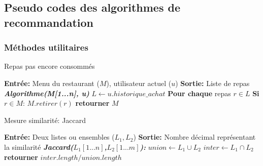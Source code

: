 \documentclass[11pt]{article}
\begin{document}
\subsection{Pseudo codes des algorithmes de recommandation}
\label{annexe}
\subsubsection{Méthodes utilitaires}
\begin{algorithm}
    \caption{Repas pas encore consommés}
    \begin{algorithmic}[1]
    \Statex \textbf{Entrée:} Menu du restaurant ($M$), utilisateur actuel ($u$)
    \Statex \textbf{Sortie:} Liste de repas
    \State \textbf{\textit{Algorithme(M[1...n], u)}}
    \State \hspace{0.5cm} $L \leftarrow u.historique\_achat$
    \State \hspace{0.5cm} \textbf{Pour chaque} repas $r \in L$
    \State \hspace{1cm} \textbf{Si} $r \in M$:
    \State \hspace{1.5cm} $M.retirer(r)$
    \State \hspace{0.5cm} \textbf{retourner} $M$
    \end{algorithmic}
\end{algorithm}

\begin{algorithm}
    \caption{Mesure similarité: Jaccard}
    \begin{algorithmic}[1]
    \Statex \textbf{Entrée:} Deux listes ou ensembles ($L_1, L_2$)
    \Statex \textbf{Sortie:} Nombre décimal représentant la similarité
    \State \textbf{\textit{Jaccard($L_1[1...n]$,$L_2[1...m]$):}}
    \State \hspace{0.5cm} $union \leftarrow L_1 \cup L_2$
    \State \hspace{0.5cm} $inter \leftarrow L_1 \cap L_2$
    \State \hspace{0.5cm} \textbf{retourner} $inter.length/union.length$
    \end{algorithmic}
\end{algorithm}
\end{document}

